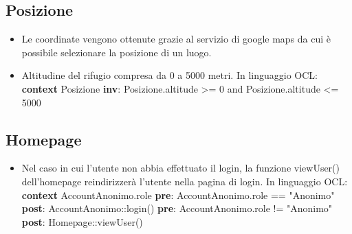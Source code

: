 \documentclass[a4paper,12pt]{article}
\begin{document}
\subsection{Posizione}
\begin{itemize}
    \item Le coordinate vengono ottenute grazie al servizio di google maps da cui è possibile selezionare la posizione di un luogo.
    \item Altitudine del rifugio compresa da 0 a 5000 metri. \newline \newline In linguaggio OCL:\newline
    \textbf{context} Posizione \textbf{inv}: Posizione.altitude >= 0 and Posizione.altitude <= 5000
\end{itemize}

\subsection{Homepage}
\begin{itemize}
    \item Nel caso in cui l'utente non abbia effettuato il login, la funzione viewUser() dell'homepage reindirizzerà l'utente nella pagina di login. \newline \newline In linguaggio OCL:\newline
    \textbf{context} AccountAnonimo.role \newline
    \textbf{pre}: AccountAnonimo.role == "Anonimo"\newline
    \textbf{post}: AccountAnonimo::login()\newline
    \textbf{pre}: AccountAnonimo.role != "Anonimo" \newline
    \textbf{post}: Homepage::viewUser()
\end{itemize}
\end{document}
